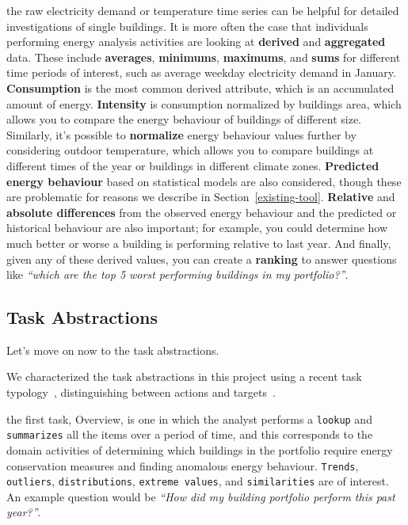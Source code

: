 \documentclass[journal]{vgtc}                %
\newcommand{\bstart}[1]{\vspace{1mm} \noindent{\textbf{#1:}}}
\begin{document}
\bstart{Derived data} the raw electricity demand or temperature time series can be helpful for detailed investigations of single buildings. 
It is more often the case that individuals performing energy analysis activities are looking at {\bf derived} and {\bf aggregated} data. 
These include {\bf averages}, {\bf minimums}, {\bf maximums}, and {\bf sums} for different time periods of interest, such as average weekday electricity demand in January.
{\bf Consumption} is the most common derived attribute, which is an accumulated amount of energy.
{\bf Intensity} is consumption normalized by buildings area, which allows you to compare the energy behaviour of buildings of different size.
Similarly, it's possible to {\bf normalize} energy behaviour values further by considering outdoor temperature, which allows you to compare buildings at different times of the year or buildings in different climate zones.
{\bf Predicted energy behaviour} based on statistical models are also considered, though these are problematic for reasons we describe in Section~\ref{existing-tool}.
{\bf Relative} and {\bf absolute differences} from the observed energy behaviour and the predicted or historical behaviour are also important; for example, you could determine how much better or worse a building is performing relative to last year.
And finally, given any of these derived values, you can create a {\bf ranking} to answer questions like {\it ``which are the top 5 worst performing buildings in my portfolio?''}.


\subsection{Task Abstractions}
\label{task-abstractions}


Let's move on now to the task abstractions.


We characterized the task abstractions in this project using a recent task typology~\cite{Brehmer2013}, distinguishing between actions and targets~\cite{Munzner2014}.

\bstart{T1 / Overview} the first task, Overview, is one in which the analyst performs a {\tt lookup} and {\tt summarizes} all the items over a period of time, and this corresponds to the domain activities of determining which buildings in the portfolio require energy conservation measures and finding anomalous energy behaviour. 
{\tt Trends}, {\tt outliers}, {\tt distributions}, {\tt extreme values}, and {\tt similarities} are of interest. 
An example question would be {\it ``How did my building portfolio perform this past year?''}.
\end{document}
